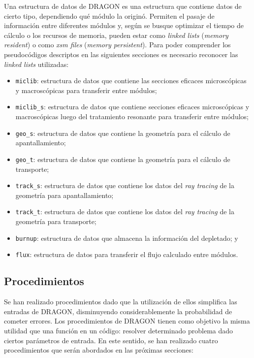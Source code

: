 \documentclass[11pt]{article}
\begin{document}
Una estructura de datos de DRAGON es una estructura que contiene datos de cierto tipo, dependiendo qué módulo la originó. Permiten el pasaje de información entre diferentes módulos y, según se busque optimizar el tiempo de cálculo o los recursos de memoria, pueden estar como \emph{linked lists} (\emph{memory resident}) o como \emph{xsm files} (\emph{memory persistent}). Para poder comprender los pseudocódigos descriptos en las siguientes secciones es necesario reconocer las \emph{linked lists} utilizadas:

\begin{itemize}
\renewcommand\labelitemi{$\cdot$}
 \item \texttt{miclib}: estructura de datos que contiene las secciones eficaces microscópicas y macroscópicas para transferir entre módulos;
 \item \texttt{miclib_s}: estructura de datos que contiene secciones eficaces microscópicas y macroscópicas luego del tratamiento resonante para transferir entre módulos;
 \item \texttt{geo_s}: estructura de datos que contiene la geometría para el cálculo de apantallamiento;
 \item \texttt{geo_t}: estructura de datos que contiene la geometría para el cálculo de transporte;
 \item \texttt{track_s}: estructura de datos que contiene los datos del \emph{ray tracing} de la geometría para apantallamiento;
 \item \texttt{track_t}: estructura de datos que contiene los datos del \emph{ray tracing} de la geometría para transporte;
 \item \texttt{burnup}: estructura de datos que almacena la información del depletado; y
 \item \texttt{flux}: estructura de datos para transferir el flujo calculado entre módulos.
\end{itemize}


\subsection{Procedimientos}

Se han realizado procedimientos dado que la utilización de ellos simplifica las entradas de DRAGON, disminuyendo considerablemente la probabilidad de cometer errores. Los procedimientos de DRAGON tienen como objetivo la misma utilidad que una función en un código: resolver determinado problema dado ciertos parámetros de entrada. En este sentido, se han realizado cuatro procedimientos que serán abordados en las próximas secciones:
\end{document}
